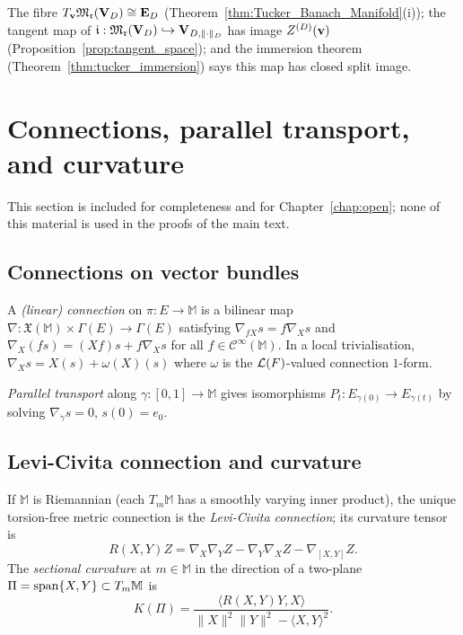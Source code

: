 \begin{remark}
\label{rem:app:tangent_TM}
The fibre $T_{\mathbf{v}}\mathfrak{M}_{\mathfrak{r}}(\mathbf{V}_D)\cong\mathbf{E}_{D}$
(Theorem~\ref{thm:Tucker_Banach_Manifold}(i)); the tangent map of
$\mathfrak{i}:\mathfrak{M}_{\mathfrak{r}}(\mathbf{V}_D)\hookrightarrow\mathbf{V}_{D,\|\cdot\|_D}$ has image
$Z^{(D)}(\mathbf{v})$ (Proposition~\ref{prop:tangent_space}); and the immersion
theorem (Theorem~\ref{thm:tucker_immersion}) says this map has
closed split image.
\end{remark}

\section{Connections, parallel transport, and curvature}
\label{app:manifolds:connections}

This section is included for completeness and for
Chapter~\ref{chap:open}; none of this material is used in the
proofs of the main text.

\subsection*{Connections on vector bundles}

A \emph{(linear) connection} on $\pi:E\to\mathbb{M}$ is a bilinear
map $\nabla:\mathfrak{X}(\mathbb{M})\times\Gamma(E)\to\Gamma(E)$
satisfying $\nabla_{fX}s=f\nabla_Xs$ and
$\nabla_X(fs)=(Xf)s+f\nabla_Xs$ for all $f\in\mathcal{C}^\infty(\mathbb{M})$.
In a local trivialisation, $\nabla_Xs=X(s)+\omega(X)(s)$ where $\omega$
is the $\mathcal{L}(F)$-valued connection $1$-form.

\emph{Parallel transport} along $\gamma:[0,1]\to\mathbb{M}$ gives
isomorphisms $P_t:E_{\gamma(0)}\to E_{\gamma(t)}$ by solving
$\nabla_{\dot\gamma}s=0$, $s(0)=e_0$.

\subsection*{Levi-Civita connection and curvature}

If $\mathbb{M}$ is Riemannian (each $T_m\mathbb{M}$ has a smoothly
varying inner product), the unique torsion-free metric connection is
the \emph{Levi-Civita connection}; its curvature tensor is
\begin{equation}
\label{eq:app:curvature_tensor}
    R(X,Y)Z
    = \nabla_X\nabla_YZ - \nabla_Y\nabla_XZ - \nabla_{[X,Y]}Z.
\end{equation}
The \emph{sectional curvature} at $m \in \mathbb{M}$ in the direction
of a two-plane $\Pi = \mathrm{span}\{X,Y\} \subset T_m\mathbb{M}$ is
\begin{equation}
\label{eq:app:sectional_curvature}
    K(\Pi) = \frac{\langle R(X,Y)Y, X\rangle}
    {\|X\|^2\|Y\|^2 - \langle X,Y\rangle^2}.
\end{equation}

